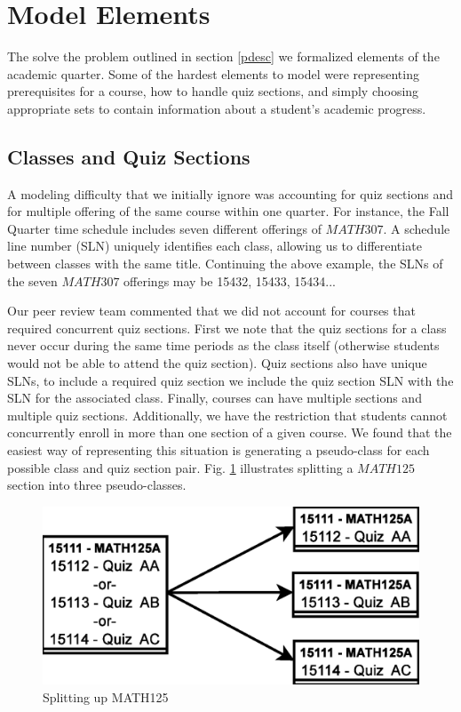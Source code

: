 \documentclass[11pt]{article} %
\begin{document}
\section{Model Elements} The solve the problem outlined in section \ref{pdesc}
we formalized elements of the academic quarter. Some of the hardest elements to
model were representing prerequisites for a course, how to handle quiz sections,
and simply choosing appropriate sets to contain information about a student's
academic progress.

\subsection{Classes and Quiz Sections} \label{classDefs} A modeling
difficulty that we initially ignore was accounting for quiz sections and
for multiple offering of the same course within one quarter.
For instance, the Fall Quarter time schedule includes seven different
offerings of $MATH307$.  A schedule line number (SLN)
uniquely identifies each class, allowing us to differentiate between classes
with the same title.  Continuing the above example,
the SLNs of the seven $MATH307$ offerings may be 15432, 15433, 15434...

Our peer review team commented that we did not account for courses that
required concurrent quiz sections.  First we note that the quiz sections for
a class never occur during the same time periods as the class itself (otherwise
students would not be able to attend the quiz section).  Quiz sections also have
unique SLNs, to include a required quiz section we include the quiz section SLN
with the SLN for the associated class.  Finally, courses can have multiple sections
and multiple quiz sections.  Additionally, we have the restriction that students
cannot concurrently enroll in more than one section of a given course.  We found that
the easiest way of representing this situation is generating a pseudo-class for each
possible class and quiz section pair.
Fig. \ref{quizzes} illustrates splitting a $MATH125$ section into three pseudo-classes.
\begin{figure} [ht] 
    \begin{center}
        \includegraphics[scale=0.4]{quiz_sections} 
    \end{center}
    \caption{Splitting up MATH125} 
    \label{quizzes} 
\end{figure}
\end{document}
